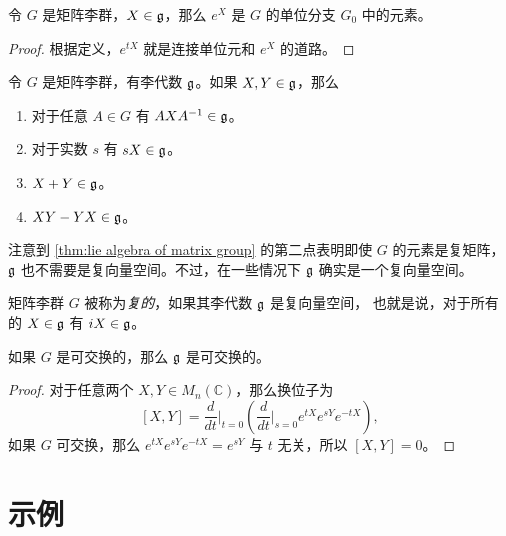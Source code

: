 \begin{proposition}
  令 $G$ 是矩阵李群，$X\in\mathfrak{g}$，那么 $e^X$ 是 $G$ 的单位分支 $G_0$
  中的元素。
\end{proposition}
\begin{proof}
  根据定义，$e^{tX}$ 就是连接单位元和 $e^X$ 的道路。
\end{proof}

\begin{theorem}\label{thm:lie algebra of matrix group}
  令 $G$ 是矩阵李群，有李代数 $\mathfrak{g}$。如果 $X,Y\in\mathfrak{g}$，那么
  \begin{enumerate}
    \item 对于任意 $A\in G$ 有 $AXA^{-1}\in\mathfrak{g}$。
    \item 对于实数 $s$ 有 $sX\in\mathfrak{g}$。
    \item $X+Y\in\mathfrak{g}$。
    \item $XY-YX\in\mathfrak{g}$。
  \end{enumerate}
\end{theorem}

注意到 \autoref{thm:lie algebra of matrix group} 的第二点表明即使
$G$ 的元素是复矩阵，$\mathfrak{g}$ 也不需要是复向量空间。不过，在一些情况下
$\mathfrak{g}$ 确实是一个复向量空间。

\begin{definition}
  矩阵李群 $G$ 被称为\emph{复的}，如果其李代数 $\mathfrak{g}$ 是复向量空间，
  也就是说，对于所有的 $X\in\mathfrak{g}$ 有 $iX\in\mathfrak{g}$。
\end{definition}

\begin{proposition}
  如果 $G$ 是可交换的，那么 $\mathfrak{g}$ 是可交换的。
\end{proposition}
\begin{proof}
  对于任意两个 $X,Y\in M_n(\mathbb{C})$，那么换位子为
  \[
    [X,Y]=\frac{d}{dt}\bigg|_{t=0}\left(\frac{d}{dt}\bigg|_{s=0}e^{tX}e^{sY}e^{-tX}\right),
  \]
  如果 $G$ 可交换，那么 $e^{tX}e^{sY}e^{-tX}=e^{sY}$ 与 $t$ 无关，所以 
  $[X,Y]=0$。
\end{proof}

\section{示例}






 




